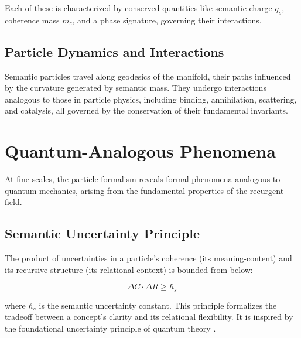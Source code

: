 Each of these is characterized by conserved quantities like semantic charge \(q_s\), coherence mass \(m_c\), and a phase signature, governing their interactions.


\subsection{Particle Dynamics and Interactions}
\label{13.6.2:particle_dynamics_and_interactions}

Semantic particles travel along geodesics of the manifold, their paths influenced by the curvature generated by semantic mass. They undergo interactions analogous to those in particle physics, including binding, annihilation, scattering, and catalysis, all governed by the conservation of their fundamental invariants.


\section{Quantum-Analogous Phenomena}
\label{13.7:quantum_analogous_phenomena}

At fine scales, the particle formalism reveals formal phenomena analogous to quantum mechanics, arising from the fundamental properties of the recurgent field.


\subsection{Semantic Uncertainty Principle}
\label{13.7.1:semantic_uncertainty_principle}

The product of uncertainties in a particle's coherence (its meaning-content) and its recursive structure (its relational context) is bounded from below:

\begin{equation}
\Delta C \cdot \Delta R \geq \hbar_s
\end{equation}

where \(\hbar_s\) is the semantic uncertainty constant. This principle formalizes the tradeoff between a concept's clarity and its relational flexibility. It is inspired by the foundational uncertainty principle of quantum theory \autocite{Heisenberg1927, WheelerZurek1983}.

